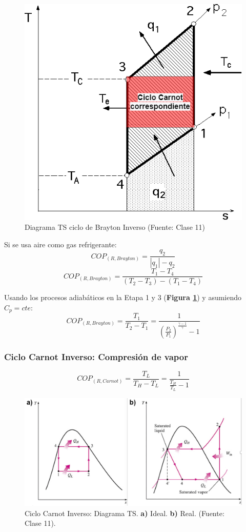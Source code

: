         \begin{figure}
            \includegraphics[width=.4\textwidth]{img/clases/ciclo_brayton_inv_ts.png}
            \caption{Diagrama TS ciclo de Brayton Inverso (Fuente: Clase 11)}
            \label{fig:brayton_ts_inv}
        \end{figure}
        
        Si se usa aire como gas refrigerante:
        \[{COP}_{(R, Brayton)}=\frac{q_{2}}{|q_{1}|-q_{2}}\]
        \[{COP}_{(R, Brayton)}=\frac{T_{1}-T_{4}}{(T_{2}-T_{3})-(T_{1}-T_{4})}\]
        
        Usando los procesos adiabáticos en la Etapa 1 y 3 (\textbf{Figura \ref{fig:brayton_ts_inv}}) y asumiendo \(C_{p} = cte\):
        \[{COP}_{(R, Brayton)} = \frac{T_{1}}{T_{2}-T_{1}} = \frac{1}{\left ( \frac{P_{2}}{P_{1}} \right )^{\frac{\gamma - 1}{\gamma}} - 1}\]
        
        \subsubsection{Ciclo Carnot Inverso: Compresión de vapor}
        
        \[{COP}_{(R, Carnot)}=\frac{T_{L}}{T_{H}-T_{L}}=\frac{1}{\frac{T_{H}}{T_{L}}-1}\]
        
        \begin{figure}[H]
            \includegraphics[width=.9\textwidth]{img/clases/ciclo_carnot_inv_ts.png}
            \caption[Ciclo Carnot Inverso: Diagrama TS]{Ciclo Carnot Inverso: Diagrama TS. \textbf{a)} Ideal. \textbf{b)} Real. (Fuente: Clase 11).}
            \label{fig:ciclo_carnot_inv_ts}
        \end{figure}
    
